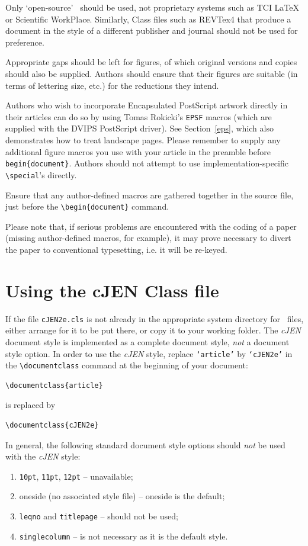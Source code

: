 \documentclass[]{cJEN2e}
\begin{document}
Only `open-source' \LaTeXe\ should be used, not proprietary systems such as TCI LaTeX or Scientific WorkPlace. Similarly, Class files such as REVTex4 that produce a document in the style of a different publisher and journal should not be used for preference.

Appropriate gaps should be left for figures, of which original versions and copies should also be supplied.
Authors should ensure that their figures are suitable (in terms of lettering size, etc.) for the reductions they
intend.

Authors who wish to incorporate Encapsulated PostScript artwork directly in their articles can do so by using
Tomas Rokicki's {\tt EPSF} macros (which are supplied with the DVIPS PostScript driver). See Section~\ref{eps},
which also demonstrates how to treat landscape pages. Please remember to supply any additional figure macros you
use with your article in the preamble before \verb"begin{document}". Authors should not attempt to use
implementation-specific \verb"\special"'s directly.

Ensure that any author-defined macros are gathered together in the source file, just before the
\verb"\begin{document}" command.

Please note that, if serious problems are encountered with the coding of a paper (missing author-defined macros,
for example), it may prove necessary to divert the paper to conventional typesetting, i.e. it will be re-keyed.

\section{Using the {\bi cJEN} Class file}

If the file {\tt cJEN2e.cls} is not already in the appropriate system directory for \LaTeXe\ files, either
arrange for it to be put there, or copy it to your working folder. The {\it cJEN} document style is implemented
as a complete document style, {\em not\/} a document style option. In order to use the {\it cJEN} style, replace
{\tt `article'} by {\tt `cJEN2e'} in the \verb"\documentclass" command at the beginning of your document:
%
\begin{verbatim}
\documentclass{article}
\end{verbatim}
%
is replaced by
%
\begin{verbatim}
\documentclass{cJEN2e}
\end{verbatim}
%
In general, the following standard document style options should {\em not\/} be used with the {\it cJEN} style:
%
\begin{enumerate}
   \item {\tt 10pt}, {\tt 11pt}, {\tt 12pt} -- unavailable;
   \item oneside (no associated style file) -- oneside is the default;
   \item {\tt leqno} and {\tt titlepage} -- should not be used;
   \item {\tt singlecolumn} -- is not necessary as it is the default style.
\end{enumerate}
%
\end{document}

